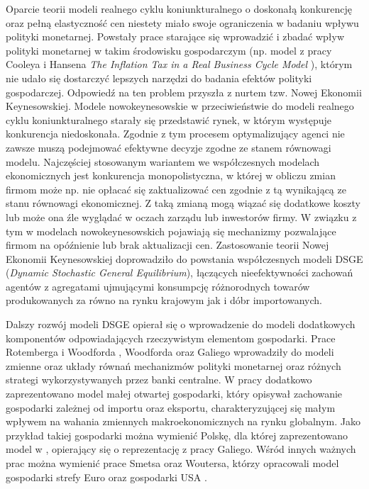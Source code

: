 Oparcie teorii modeli realnego cyklu koniunkturalnego o doskonałą konkurencję oraz pełną elastyczność cen niestety miało swoje ograniczenia w badaniu wpływu polityki monetarnej. Powstały prace starające się wprowadzić i zbadać wpływ polityki monetarnej w takim środowisku gospodarczym (np. model z pracy Cooleya i Hansena \emph{The Inflation Tax in a Real Business Cycle Model} \cite{cooley_hansen}), którym nie udało się dostarczyć lepszych narzędzi do badania efektów polityki gospodarczej. Odpowiedź na ten problem przyszła z nurtem tzw. Nowej Ekonomii Keynesowskiej. Modele nowokeynesowskie w przeciwieństwie do modeli realnego cyklu koniunkturalnego starały się przedstawić rynek, w którym występuje konkurencja niedoskonała. Zgodnie z tym procesem optymalizujący agenci nie zawsze muszą podejmować efektywne decyzje zgodne ze stanem równowagi modelu. Najczęściej stosowanym wariantem we współczesnych modelach ekonomicznych jest konkurencja monopolistyczna, w której w obliczu zmian firmom może np. nie opłacać się zaktualizować cen zgodnie z tą wynikającą ze stanu równowagi ekonomicznej. Z taką zmianą mogą wiązać się dodatkowe koszty lub może ona źle wyglądać w oczach zarządu lub inwestorów firmy. W związku z tym w modelach nowokeynesowskich pojawiają się mechanizmy pozwalające firmom na opóźnienie lub brak aktualizacji cen. Zastosowanie teorii Nowej Ekonomii Keynesowskiej doprowadziło do powstania współczesnych modeli DSGE (\emph{Dynamic Stochastic General Equilibrium}), łączących nieefektywności zachowań agentów z agregatami ujmującymi konsumpcję różnorodnych towarów produkowanych za równo na rynku krajowym jak i dóbr importowanych.

Dalszy rozwój modeli DSGE opierał się o wprowadzenie do modeli dodatkowych komponentów odpowiadających rzeczywistym elementom gospodarki. Prace Rotemberga i Woodforda \cite{doi:10.1086/654340}, Woodforda \cite{woodford_2005} oraz Galiego \cite{gali} wprowadziły do modeli zmienne oraz układy równań mechanizmów polityki monetarnej oraz różnych strategi wykorzystywanych przez banki centralne. W pracy \cite{gali} dodatkowo zaprezentowano model małej otwartej gospodarki, który opisywał zachowanie gospodarki zależnej od importu oraz eksportu, charakteryzującej się małym wpływem na wahania zmiennych makroekonomicznych na rynku globalnym. Jako przykład takiej gospodarki można wymienić Polskę, dla której zaprezentowano model w \cite{nbpKoloch}, opierający się o reprezentację z pracy Galiego. Wśród innych ważnych prac można wymienić prace Smetsa oraz Woutersa, którzy opracowali model gospodarki strefy Euro \cite{10.1162/154247603770383415} oraz gospodarki USA \cite{10.1257/aer.97.3.586}.

